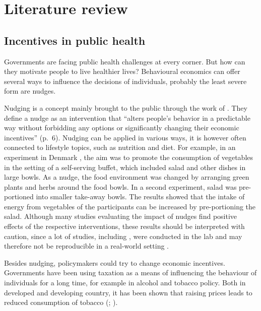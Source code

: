 \documentclass{scrbook}
\begin{document}
\section{Literature review}

\subsection{Incentives in public health}

Governments are facing public health challenges at every corner. But how
can they motivate people to live healthier lives? Behavioural economics
can offer several ways to influence the decisions of individuals,
probably the least severe form are nudges.

Nudging is a concept mainly brought to the public through the work of
\textcite{thaler_nudge_2008}. They define a nudge as an intervention
that ``alters people's behavior in a predictable way without forbidding
any options or significantly changing their economic incentives''
(p.~6). Nudging can be applied in various ways, it is however often
connected to lifestyle topics, such as nutrition and diet. For example,
in an experiment in Denmark \parencite{friis_comparison_2017}, the aim
was to promote the consumption of vegetables in the setting of a
self-serving buffet, which included salad and other dishes in large
bowls. As a nudge, the food environment was changed by arranging green
plants and herbs around the food bowls. In a second experiment, salad
was pre-portioned into smaller take-away bowls. The results showed that
the intake of energy from vegetables of the participants can be
increased by pre-portioning the salad. Although many studies evaluating
the impact of nudges find positive effects of the respective
interventions, these results should be interpreted with caution, since a
lot of studies, including \textcite{friis_comparison_2017}, were
conducted in the lab and may therefore not be reproducible in a
real-world setting \parencite{ledderer_nudging_2020}.

Besides nudging, policymakers could try to change economic incentives.
Governments have been using taxation as a means of influencing the
behaviour of individuals for a long time, for example in alcohol and
tobacco policy. Both in developed and developing country, it has been
shown that raising prices leads to reduced consumption of tobacco
(\cite{yeh_effects_2017}; \cite{immurana_effects_2021}).
\end{document}

